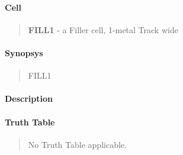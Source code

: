\label{FILL1}
\paragraph{Cell}
\begin{quote}
    \textbf{FILL1} - a Filler cell, 1-metal Track wide
\end{quote}

\paragraph{Synopsys}
\begin{quote}
    FILL1
\end{quote}

\paragraph{Description}


\paragraph{Truth Table}
\begin{quote}
No Truth Table applicable.
\end{quote}

